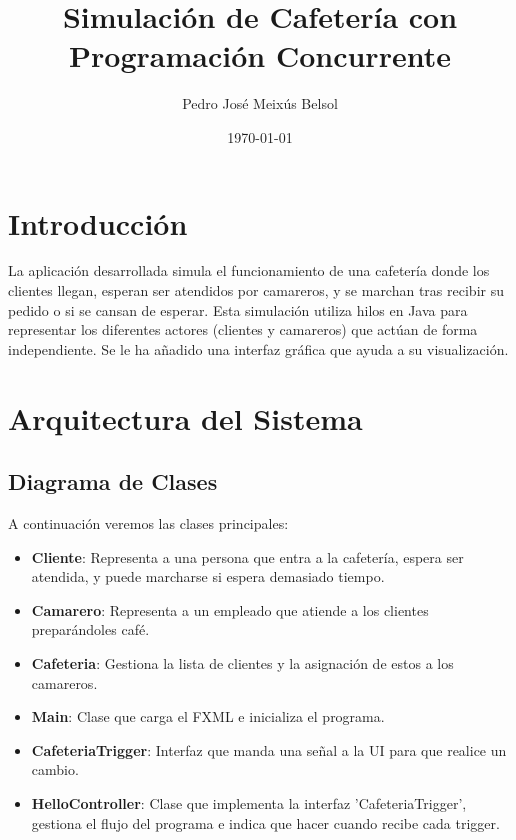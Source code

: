 \documentclass[a4paper,12pt]{article}
\title{Simulación de Cafetería con Programación Concurrente}
\author{Pedro José Meixús Belsol}
\date{\today}
\begin{document}
\maketitle
\newpage

\tableofcontents

\newpage

\section{Introducción}

La aplicación desarrollada simula el funcionamiento de una cafetería donde los clientes llegan, esperan ser atendidos por camareros, y se marchan tras recibir su pedido o si se cansan de esperar. Esta simulación utiliza hilos en Java para representar los diferentes actores (clientes y camareros) que actúan de forma independiente. Se le ha añadido una interfaz gráfica que ayuda a su visualización.

\section{Arquitectura del Sistema}

\subsection{Diagrama de Clases}

A continuación veremos las clases principales:

\begin{itemize}
    \item \textbf{Cliente}: Representa a una persona que entra a la cafetería, espera ser atendida, y puede marcharse si espera demasiado tiempo.
    \item \textbf{Camarero}: Representa a un empleado que atiende a los clientes preparándoles café.
    \item \textbf{Cafeteria}: Gestiona la lista de clientes y la asignación de estos a los camareros.
    \item \textbf{Main}: Clase que carga el FXML e inicializa el programa.
    \item \textbf{CafeteriaTrigger}: Interfaz que manda una señal a la UI para que realice un cambio.
    \item \textbf{HelloController}: Clase que implementa la interfaz 'CafeteriaTrigger', gestiona el flujo del programa e indica que hacer cuando recibe cada trigger.
\end{itemize}
\end{document}
